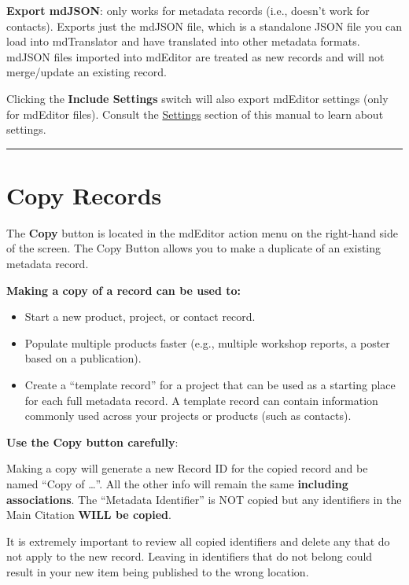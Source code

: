\documentclass[
]{book}
\makeatletter
\providecommand{\tightlist}{%
  \setlength{\itemsep}{0pt}\setlength{\parskip}{0pt}}
\newenvironment{kframe}{%
\medskip{}
\setlength{\fboxsep}{.8em}
 \def\at@end@of@kframe{}%
 \ifinner\ifhmode%
  \def\at@end@of@kframe{\end{minipage}}%
  \begin{minipage}{\columnwidth}%
 \fi\fi%
 \def\FrameCommand##1{\hskip\@totalleftmargin \hskip-\fboxsep
 \colorbox{shadecolor}{##1}\hskip-\fboxsep
     \hskip-\linewidth \hskip-\@totalleftmargin \hskip\columnwidth}%
 \MakeFramed {\advance\hsize-\width
   \@totalleftmargin\z@ \linewidth\hsize
   \@setminipage}}%
 {\par\unskip\endMakeFramed%
 \at@end@of@kframe}
\newenvironment{rmdblock}[1]
  {
  \begin{itemize}
  \renewcommand{\labelitemi}{
    \raisebox{-.7\height}[0pt][0pt]{
      {\setkeys{Gin}{width=3em,keepaspectratio}\texttt{[image: images/\#1]}}
    }
  }
  \setlength{\fboxsep}{1em}
  \begin{kframe}
  \item
  }
  {
  \end{kframe}
  \end{itemize}
  }
\newenvironment{rmdwarning}
  {\begin{rmdblock}{warning}}
  {\end{rmdblock}}
\makeatother
\begin{document}
\textbf{Export mdJSON}: only works for metadata records (i.e., doesn't work for contacts). Exports just the mdJSON file, which is a standalone JSON file you can load into mdTranslator and have translated into other metadata formats. mdJSON files imported into mdEditor are treated as new records and will not merge/update an existing record.

Clicking the \textbf{Include Settings} switch will also export mdEditor settings (only for mdEditor files). Consult the \protect\hyperlink{settings}{Settings} section of this manual to learn about settings.

\begin{center}\rule{0.5\linewidth}{\linethickness}\end{center}

\hypertarget{copy-records}{%
\section*{Copy Records}\label{copy-records}}

The \textbf{Copy} button is located in the mdEditor action menu on the right-hand side of the screen. The Copy Button allows you to make a duplicate of an existing metadata record.

\textbf{Making a copy of a record can be used to:}

\begin{itemize}
\tightlist
\item
  Start a new product, project, or contact record.
\item
  Populate multiple products faster (e.g., multiple workshop reports, a poster based on a publication).
\item
  Create a ``template record'' for a project that can be used as a starting place for each full metadata record. A template record can contain information commonly used across your projects or products (such as contacts).
\end{itemize}

\textbf{Use the Copy button carefully}:

Making a copy will generate a new Record ID for the copied record and be named ``Copy of \ldots{}''. All the other info will remain the same \textbf{including associations}. The ``Metadata Identifier'' is NOT copied but any identifiers in the Main Citation \textbf{WILL be copied}.

\begin{rmdwarning}
It is extremely important to review all copied identifiers and delete
any that do not apply to the new record. Leaving in identifiers that do
not belong could result in your new item being published to the wrong
location.
\end{rmdwarning}
\end{document}
